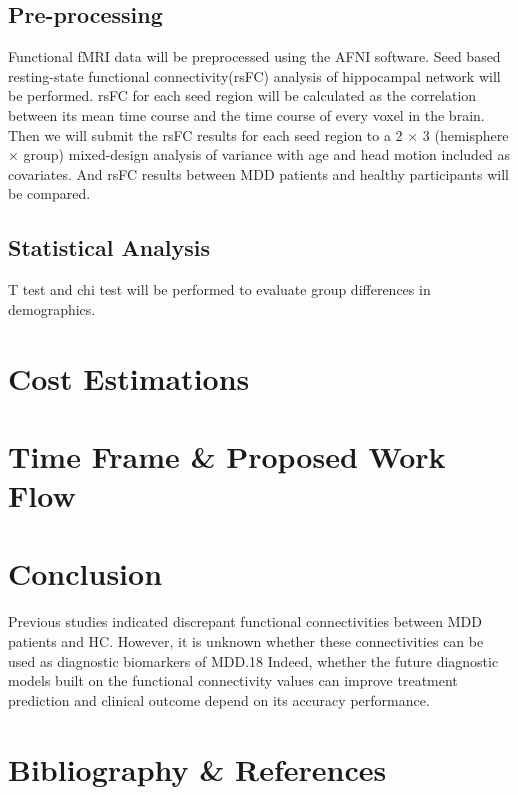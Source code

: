 \documentclass{article}
\begin{document}
\subsection{Pre-processing}

Functional fMRI data will be preprocessed using the AFNI software.
Seed based resting-state functional connectivity(rsFC) analysis of
hippocampal network will be performed. rsFC for each seed region will
be calculated as the correlation between its mean time course and the
time course of every voxel in the brain. Then we will submit the rsFC
results for each seed region to a 2 × 3 (hemisphere × group)
mixed-design analysis of variance with age and head motion included as
covariates. And rsFC results between MDD patients and healthy
participants will be compared.

\subsection{Statistical Analysis}

T test and chi test will be performed to evaluate group differences in
demographics.

\newpage

\section{Cost Estimations}
\section{Time Frame \& Proposed Work Flow}
\section{Conclusion}

Previous studies indicated discrepant functional connectivities
between MDD patients and HC. However, it is unknown whether these
connectivities can be used as diagnostic biomarkers of MDD.18 Indeed,
whether the future diagnostic models built on the functional
connectivity values can improve treatment prediction and clinical
outcome depend on its accuracy performance.

\section{Bibliography \& References}
\end{document}
